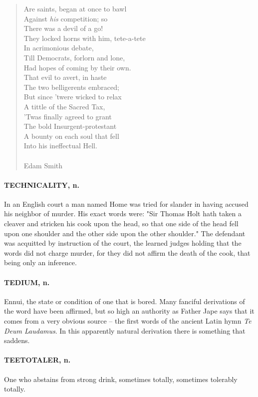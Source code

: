 \documentclass[11pt]{article}
\begin{document}
\begin{quote}
  Are saints, began at once to bawl \\
  Against {\em his} competition; so \\
  There was a devil of a go! \\
  They locked horns with him, tete-a-tete \\
  In acrimonious debate, \\
  Till Democrats, forlorn and lone, \\
  Had hopes of coming by their own. \\
  That evil to avert, in haste \\
  The two belligerents embraced; \\
  But since 'twere wicked to relax \\
  A tittle of the Sacred Tax, \\
  'Twas finally agreed to grant \\
  The bold Insurgent-protestant \\
  A bounty on each soul that fell \\
  Into his ineffectual Hell. \\
 \\
Edam Smith \end{quote}


\paragraph{TECHNICALITY, n.}  In an English court a man named Home was tried for
slander in having accused his neighbor of murder.  His exact words
were:  "Sir Thomas Holt hath taken a cleaver and stricken his cook
upon the head, so that one side of the head fell upon one shoulder and
the other side upon the other shoulder."  The defendant was acquitted
by instruction of the court, the learned judges holding that the words
did not charge murder, for they did not affirm the death of the cook,
that being only an inference.

\paragraph{TEDIUM, n.}  Ennui, the state or condition of one that is bored.  Many
fanciful derivations of the word have been affirmed, but so high an
authority as Father Jape says that it comes from a very obvious
source -- the first words of the ancient Latin hymn {\em Te Deum
Laudamus}.  In this apparently natural derivation there is something
that saddens.

\paragraph{TEETOTALER, n.}  One who abstains from strong drink, sometimes totally,
sometimes tolerably totally.
\end{document}
